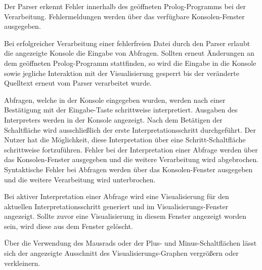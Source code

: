 \documentclass[parskip=full,11pt,twoside]{scrartcl}
\begin{document}
Der Parser erkennt Fehler innerhalb des geöffneten Prolog-Programms bei der Verarbeitung. Fehlermeldungen werden über das verfügbare Konsolen-Fenster ausgegeben.


Bei erfolgreicher Verarbeitung einer fehlerfreien Datei durch den Parser erlaubt die angezeigte Konsole die Eingabe von Abfragen. Sollten erneut Änderungen an dem geöffneten Prolog-Programm stattfinden, so wird die Eingabe in die Konsole sowie jegliche Interaktion mit der Visualisierung gesperrt bis der veränderte Quelltext erneut vom Parser verarbeitet wurde.


Abfragen, welche in der Konsole eingegeben wurden, werden nach einer Bestätigung mit der Eingabe-Taste schrittweise interpretiert. Ausgaben des Interpreters werden in der Konsole angezeigt. Nach dem Betätigen der Schaltfläche wird ausschließlich der erste Interpretationsschritt durchgeführt. Der Nutzer hat die Möglichkeit, diese Interpretation über eine Schritt-Schaltfläche schrittweise fortzuführen. Fehler bei der Interpretation einer Abfrage werden über das Konsolen-Fenster ausgegeben und die weitere Verarbeitung wird abgebrochen. Syntaktische Fehler bei Abfragen werden über das Konsolen-Fenster ausgegeben und die weitere Verarbeitung wird unterbrochen.


Bei aktiver Interpretation einer Abfrage wird eine Visualisierung für den aktuellen Interpretationsschritt generiert und im Visualisierungs-Fenster angezeigt. Sollte zuvor eine Visualisierung in diesem Fenster angezeigt worden sein, wird diese aus dem Fenster gelöscht.


Über die Verwendung des Mausrads oder der Plus- und Minus-Schaltflächen lässt sich der angezeigte Ausschnitt des Visualisierungs-Graphen vergrößern oder verkleinern.

\end{document}
